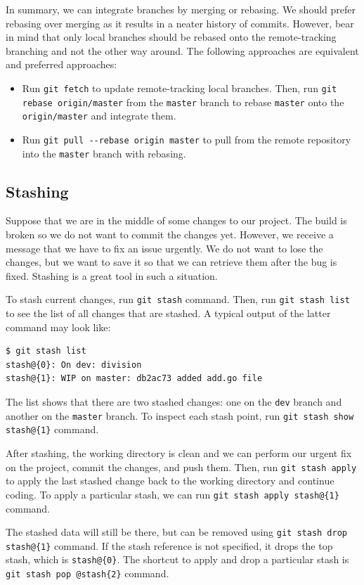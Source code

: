 \documentclass[11pt]{article}
\begin{document}
In summary, we can integrate branches by merging or rebasing. We should prefer rebasing over merging as it results in a neater history of commits. However, bear in mind that only local branches should be rebased onto the remote-tracking branching and not the other way around. The following approaches are equivalent and preferred approaches:
\begin{itemize}
\item Run \texttt{git fetch} to update remote-tracking local branches. Then, run \texttt{git rebase origin/master} from the \texttt{master} branch to rebase \texttt{master} onto the \texttt{origin/master} and integrate them.
\item Run \texttt{git pull -{}-rebase origin master} to pull from the remote repository into the \texttt{master} branch with rebasing.
\end{itemize}

\subsection{Stashing}
\label{sec:orgheadline13}
Suppose that we are in the middle of some changes to our project. The build is broken so we do not want to commit the changes yet. However, we receive a message that we have to fix an issue urgently. We do not want to lose the changes, but we want to save it so that we can retrieve them after the bug is fixed. Stashing is a great tool in such a situation.

To stash current changes, run \texttt{git stash} command. Then, run \texttt{git stash list} to see the list of all changes that are stashed. A typical output of the latter command may look like:
\begin{verbatim}
$ git stash list
stash@{0}: On dev: division
stash@{1}: WIP on master: db2ac73 added add.go file
\end{verbatim}
The list shows that there are two stashed changes: one on the \texttt{dev} branch and another on the \texttt{master} branch. To inspect each stash point, run \texttt{git stash show stash@\{1\}} command.

After stashing, the working directory is clean and we can perform our urgent fix on the project, commit the changes, and push them. Then, run \texttt{git stash apply} to apply the last stashed change back to the working directory and continue coding. To apply a particular stash, we can run \texttt{git stash apply stash@\{1\}} command.

The stashed data will still be there, but can be removed using \texttt{git stash drop stash@\{1\}} command. If the stash reference is not specified, it drops the top stash, which is \texttt{stash@\{0\}}. The shortcut to apply and drop a particular stash is \texttt{git stash pop @stash\{2\}} command.
\end{document}
